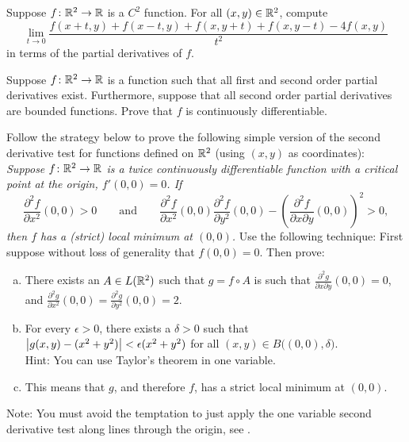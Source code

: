 \begin{exercise}
Suppose $f \colon {\mathbb{R}}^2 \to {\mathbb{R}}$ is a $C^2$ function.
For all $(x,y) \in {\mathbb{R}}^2$, compute
\begin{equation*}
\lim_{t \to 0}
\frac{f(x+t,y)+f(x-t,y)+f(x,y+t)+f(x,y-t) - 4f(x,y)}{t^2}
\end{equation*}
in terms of the partial derivatives of $f$.
\end{exercise}

\begin{exercise}
Suppose $f \colon {\mathbb{R}}^2 \to {\mathbb{R}}$ is a function such that
all first and second order partial derivatives exist.  Furthermore,
suppose that all second order partial derivatives are bounded functions.
Prove that $f$ is continuously differentiable.
\end{exercise}

\begin{samepage}
\begin{exercise}
Follow the strategy below to
prove the following simple version of the second derivative test for
functions defined on ${\mathbb{R}}^2$ (using $(x,y)$ as coordinates):  \emph{Suppose $f \colon {\mathbb{R}}^2
\to {\mathbb{R}}$ is a twice continuously differentiable function with a
critical point at the origin, $f'(0,0) = 0$.  If
\begin{equation*}
\frac{\partial^2 f}{\partial x^2} (0,0) > 0 \qquad \text{and} \qquad
\frac{\partial^2 f}{\partial x^2} (0,0) \frac{\partial^2 f}{\partial y^2}
(0,0) -
{\left(\frac{\partial^2 f}{\partial x \partial y} (0,0) \right)}^2 > 0 ,
\end{equation*}
then $f$ has a (strict) local minimum at $(0,0)$.}
Use the following technique:  First suppose without loss of generality
that $f(0,0) = 0$.  Then prove:
\begin{enumerate}[a)]
\item
There exists an $A \in L({\mathbb{R}}^2)$ such that $g = f \circ A$ is
such that $\frac{\partial^2 g}{\partial x \partial y} (0,0) = 0$, and
$\frac{\partial^2 g}{\partial x^2} (0,0) =
\frac{\partial^2 g}{\partial y^2} (0,0) = 2$.
\item
For every $\epsilon > 0$, there exists a $\delta > 0$
such that 
$\bigl\lvert {g(x,y) - (x^2 + y^2)} \bigr\rvert < \epsilon (x^2+y^2)$ for all
$(x,y) \in B\bigl((0,0),\delta\bigr)$.\\
Hint: You can use Taylor's theorem in one variable.
\item
This means that $g$, and therefore $f$, has a strict local
minimum at $(0,0)$.
\end{enumerate}
Note: You must avoid the temptation to just
apply the one variable second derivative test along lines through the
origin, see .
\end{exercise}
\end{samepage}
